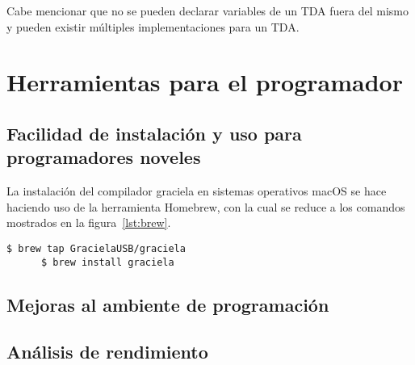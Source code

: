 Cabe mencionar que no se pueden declarar variables de un TDA fuera del mismo y
pueden existir múltiples implementaciones para un TDA.

\section{Herramientas para el programador}
\subsection{Facilidad de instalación y uso para programadores noveles}
\begin{description}[leftmargin=!,labelwidth=\widthof{\bfseries Multiconjunto}]
  \item [APT] 

  \item[Homebrew] La instalación del compilador graciela en sistemas
    operativos macOS se hace haciendo uso de la herramienta Homebrew,
    con la cual se reduce a los comandos mostrados en la figura~\ref{lst:brew}.

    \begin{lstlisting}[caption=Instrucciones para instalar el compilador de Graciela con Homebrew, label={lst:brew}]
      $ brew tap GracielaUSB/graciela
      $ brew install graciela
    \end{lstlisting}

\end{description}
\subsection{Mejoras al ambiente de programación}
\blindtext[1]

\subsection{Análisis de rendimiento}
\blindtext[1]
